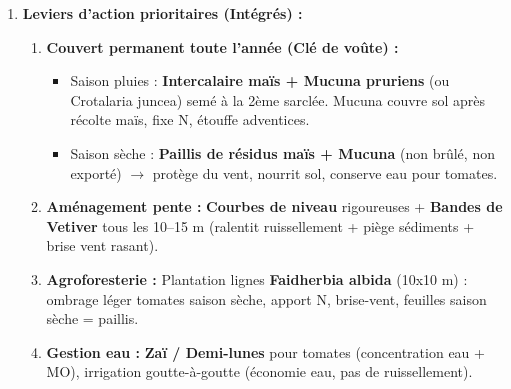 \documentclass[11pt]{article}
\begin{document}
\begin{exoresolu}
\begin{enumerate}
\begin{itemize}
        \end{itemize}
        Le sol (probablement un \textbf{Nitisol} ou \textbf{Ferralsol} lessivé, rouge, profond mais sensible à la battance) perd sa structure (MO $\downarrow$), sa porosité (battance) et sa texture fine (argile $\downarrow$ par hydrique, limon/argile $\downarrow$ par éolien). C'est un \textbf{couple érosif hydrique/éolien séquentiel} typique des hautes terres soudano-guinéennes.
    \item \textbf{Leviers d'action prioritaires (Intégrés) :}
        \begin{enumerate}
            \item \textbf{Couvert permanent toute l'année (Clé de voûte) :}
                \begin{itemize}
                    \item Saison pluies : \textbf{Intercalaire maïs + Mucuna pruriens} (ou Crotalaria juncea) semé à la 2ème sarclée. Mucuna couvre sol après récolte maïs, fixe N, étouffe adventices.
                    \item Saison sèche : \textbf{Paillis de résidus maïs + Mucuna} (non brûlé, non exporté) $\rightarrow$ protège du vent, nourrit sol, conserve eau pour tomates.
                \end{itemize}
            \item \textbf{Aménagement pente :} \textbf{Courbes de niveau} rigoureuses + \textbf{Bandes de Vetiver} tous les 10--15 m (ralentit ruissellement + piège sédiments + brise vent rasant).
            \item \textbf{Agroforesterie :} Plantation lignes \textbf{Faidherbia albida} (10x10 m) : ombrage léger tomates saison sèche, apport N, brise-vent, feuilles saison sèche = paillis.
            \item \textbf{Gestion eau :} \textbf{Zaï / Demi-lunes} pour tomates (concentration eau + MO), irrigation goutte-à-goutte (économie eau, pas de ruissellement).
        \end{enumerate}
\end{enumerate}
\end{exoresolu}
\end{document}
